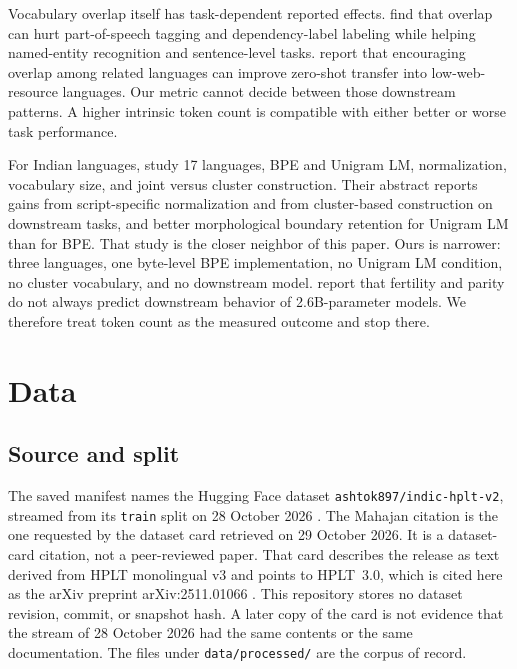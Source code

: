\documentclass[10pt,twocolumn]{article}
\begin{document}
Vocabulary overlap itself has task-dependent reported effects.
\citet{limisiewicz-etal-2023-tokenization} find that overlap can hurt part-of-speech tagging and dependency-label labeling while helping named-entity recognition and sentence-level tasks.
\citet{patil-etal-2022-overlap} report that encouraging overlap among related languages can improve zero-shot transfer into low-web-resource languages.
Our metric cannot decide between those downstream patterns.
A higher intrinsic token count is compatible with either better or worse task performance.

For Indian languages, \citet{brahma-etal-2026-multilingual} study 17 languages, BPE and Unigram LM, normalization, vocabulary size, and joint versus cluster construction.
Their abstract reports gains from script-specific normalization and from cluster-based construction on downstream tasks, and better morphological boundary retention for Unigram LM than for BPE.
That study is the closer neighbor of this paper.
Ours is narrower: three languages, one byte-level BPE implementation, no Unigram LM condition, no cluster vocabulary, and no downstream model.
\citet{ali-etal-2024-tokenizer} report that fertility and parity do not always predict downstream behavior of 2.6B-parameter models.
We therefore treat token count as the measured outcome and stop there.

\section{Data}

\subsection{Source and split}

The saved manifest names the Hugging Face dataset \texttt{ashtok897/indic-hplt-v2}, streamed from its \texttt{train} split on 28 October 2026 \citep{mahajan-2026-indic-hplt}.
The Mahajan citation is the one requested by the dataset card retrieved on 29 October 2026.
It is a dataset-card citation, not a peer-reviewed paper.
That card describes the release as text derived from HPLT monolingual v3 and points to HPLT~3.0, which is cited here as the arXiv preprint arXiv:2511.01066 \citep{oepen-etal-2025-hplt}.
This repository stores no dataset revision, commit, or snapshot hash.
A later copy of the card is not evidence that the stream of 28 October 2026 had the same contents or the same documentation.
The files under \texttt{data/processed/} are the corpus of record.
\end{document}
